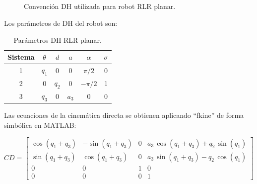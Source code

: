 \documentclass[a4paper,12pt]{article}
\begin{document}
\subsection{}
\begin{figure}[H]
    \centering
    \begin{adjustbox}{scale = 0.55, max width=\columnwidth}
    \end{adjustbox}
    \caption{Convención DH utilizada para robot RLR planar.}
\end{figure}

Los parámetros de DH del robot son:
\begin{table}[H]
    \centering
    \begin{tabular}{|c|c|c|c|c|c|}
    \hline
    Sistema & $\theta$          & $d$         & $a$         & $\alpha$     & $\sigma$ \\ \hline
    1       & $q_1$             & 0           & $0$         & $\pi/2$   & 0        \\ \hline
    2       & $0$               & $q_2$       & $0$         & $-\pi/2$  & 1        \\ \hline
    3       & $q_3$             & 0           & $a_3$  & $0$          & 0        \\ \hline
    \end{tabular}
    \caption{Parámetros DH RLR planar.}
\end{table}

Las ecuaciones de la cinemática directa se obtienen aplicando ``fkine'' de forma simbólica
en MATLAB:

\begin{equation*}
    CD = 
    \left[\begin{array}{cccc}
        \cos\left(q_{1}+q_{3}\right) & -\sin\left(q_{1}+q_{3}\right) & 0 & a_{3}\,\cos\left(q_{1}+q_{3}\right)+q_{2}\,\sin\left(q_{1}\right)\\
        \sin\left(q_{1}+q_{3}\right) & \cos\left(q_{1}+q_{3}\right) & 0 & a_{3}\,\sin\left(q_{1}+q_{3}\right)-q_{2}\,\cos\left(q_{1}\right)\\
        0 & 0 & 1 & 0\\
        0 & 0 & 0 & 1
    \end{array}
    \right]
\end{equation*}
\end{document}
